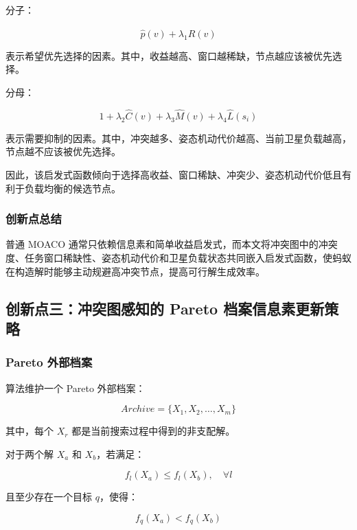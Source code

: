\documentclass[UTF8,a4paper,12pt]{ctexart}
\begin{document}
分子：

\begin{equation}
\hat{p}(v)+\lambda_1\hat{R}(v)
\end{equation}

表示希望优先选择的因素。其中，收益越高、窗口越稀缺，节点越应该被优先选择。

分母：

\begin{equation}
1+\lambda_2\hat{C}(v)+\lambda_3\hat{M}(v)+\lambda_4\hat{L}(s_i)
\end{equation}

表示需要抑制的因素。其中，冲突越多、姿态机动代价越高、当前卫星负载越高，节点越不应该被优先选择。

因此，该启发式函数倾向于选择高收益、窗口稀缺、冲突少、姿态机动代价低且有利于负载均衡的候选节点。

\subsubsection{创新点总结}

普通 MOACO 通常只依赖信息素和简单收益启发式，而本文将冲突图中的冲突度、任务窗口稀缺性、姿态机动代价和卫星负载状态共同嵌入启发式函数，使蚂蚁在构造解时能够主动规避高冲突节点，提高可行解生成效率。

\subsection{创新点三：冲突图感知的 Pareto 档案信息素更新策略}

\subsubsection{Pareto 外部档案}

算法维护一个 Pareto 外部档案：

\begin{equation}
Archive=\{X_1,X_2,\dots,X_m\}
\end{equation}

其中，每个 $X_r$ 都是当前搜索过程中得到的非支配解。

对于两个解 $X_a$ 和 $X_b$，若满足：

\begin{equation}
f_l(X_a)\leq f_l(X_b),\quad \forall l
\end{equation}

且至少存在一个目标 $q$，使得：

\begin{equation}
f_q(X_a)<f_q(X_b)
\end{equation}
\end{document}
